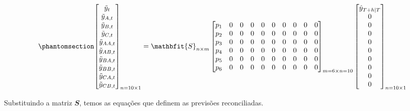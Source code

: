 \documentclass[
  12pt,
  twoside,
  openright,
  a4paper,
  chapter=TITLE,
  section=TITLE,
  brazil]{abntex2}
\begin{document}
\begin{equation}\phantomsection\label{eq-matriz_topdown3}{
\begin{bmatrix}
    \tilde{y}_{t} \\
    \tilde{y}_{A, t} \\
    \tilde{y}_{B, t} \\
    \tilde{y}_{C, t} \\
    \tilde{y}_{AA, t} \\
    \tilde{y}_{AB, t} \\
    \tilde{y}_{BA, t} \\
    \tilde{y}_{BB, t} \\
    \tilde{y}_{CA, t} \\
    \tilde{y}_{CB, t}
\end{bmatrix}_{n=10 \times 1}
=
\mathbfit{S}_{n \times m}
\begin{bmatrix}
    p_1 & 0 & 0 & 0 & 0 & 0 & 0 & 0 & 0 & 0 \\
    p_2 & 0 & 0 & 0 & 0 & 0 & 0 & 0 & 0 & 0 \\
    p_3 & 0 & 0 & 0 & 0 & 0 & 0 & 0 & 0 & 0 \\
    p_4 & 0 & 0 & 0 & 0 & 0 & 0 & 0 & 0 & 0 \\
    p_5 & 0 & 0 & 0 & 0 & 0 & 0 & 0 & 0 & 0 \\
    p_6 & 0 & 0 & 0 & 0 & 0 & 0 & 0 & 0 & 0
\end{bmatrix}_{m=6 \times n=10}
\begin{bmatrix}
    \hat{y}_{T+h|T} \\
    0 \\
    0 \\
    0 \\
    0 \\
    0 \\
    0 \\
    0 \\
    0 \\
    0
\end{bmatrix}_{n=10 \times 1}
}\end{equation}

Substituindo a matriz \(\mathbfit{S}\), temos as equações que definem as
previsões reconciliadas.
\end{document}

